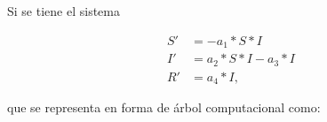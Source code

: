 \begin{itemize}
\begin{center}
\begin{adjustbox}{width=0.25\textwidth, keepaspectratio}
%
              \end{adjustbox}
          \end{center}

\end{itemize}

Si se tiene el sistema

\begin{align*}
    S' & = - a_1 * S * I         \\
    I' & = a_2 * S * I - a_3 * I \\
    R' & = a_4 * I,
\end{align*}

que se representa en forma de árbol computacional como:

